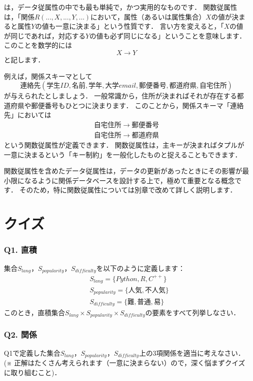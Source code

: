 は，データ従属性の中でも最も単純で，かつ実用的なものです．
関数従属性は，「関係$R(..., X, ..., Y, ...)$において，属性（あるいは属性集合）$X$の値が決まると属性$Y$の値も一意に決まる」という性質です．
言い方を変えると，「$X$の値が同じであれば，対応する$Y$の値も必ず同じになる」ということを意味します．
このことを数学的には
\begin{equation}
X \to Y
\end{equation}
と記します．

例えば，関係スキーマとして
\begin{equation}
\textbf{連絡先}(\underline{学生ID}, 名前, 学年, 大学email, 郵便番号, 都道府県, 自宅住所)
\end{equation}
が与えられたとしましょう．
一般常識から，住所が決まればそれが存在する都道府県や郵便番号もひとつに決まります．
このことから，関係スキーマ「連絡先」においては
\begin{align}
自宅住所 \to 郵便番号 \\
自宅住所 \to 都道府県
\end{align}
という関数従属性が定義できます．
関数従属性は，主キーが決まればタプルが一意に決まるという「キー制約」を一般化したものと捉えることもできます．

関数従属性を含めたデータ従属性は，データの更新があったときにその影響が最小限になるように関係データベースを設計する上で，極めて重要となる概念です．
そのため，特に関数従属性については別章で改めて詳しく説明します．


\hrulefill
\section{クイズ}
\subsubsection{Q1. 直積}
集合$S_{lang}$，$S_{popularity}$，$S_{difficulty}$を以下のように定義します：
\begin{align}
&S_{lang} = \{Python, R, C^{++}\} \\
&S_{popularity} = \{人気, 不人気\} \\
&S_{difficulty} = \{難, 普通, 易\}
\end{align}
このとき，直積集合$S_{lang} \times S_{popularity} \times S_{difficulty}$の要素をすべて列挙しなさい．


\subsubsection{Q2. 関係}
Q1で定義した集合$S_{lang}$，$S_{popularity}$，$S_{difficulty}$上の3項関係を適当に考えなさい．
(※ 正解はたくさん考えられます（一意に決まらない）ので，深く悩まずクイズに取り組むこと)．


